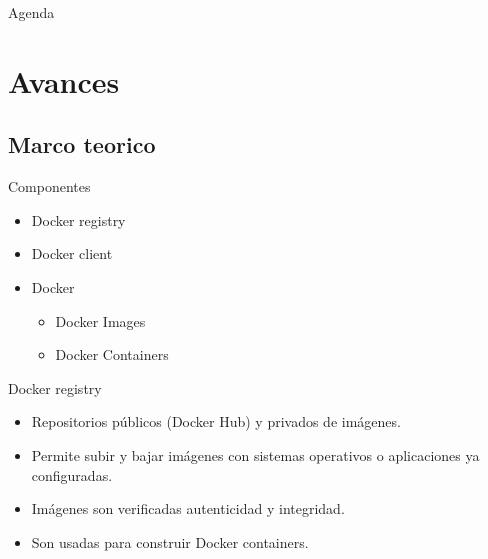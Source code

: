 \documentclass{bredelebeamer}
\begin{document}
\begin{frame}{Agenda}
  \tableofcontents
\end{frame}

\section{Avances}
\subsection{Marco teorico}

\begin{frame}{Componentes}
	
	\begin{itemize}
		\item Docker registry
		\item Docker client
		\item Docker
		\begin{itemize}
			\item Docker Images
			\item Docker Containers
		\end{itemize}

	\end{itemize}
\end{frame}


\begin{frame}{Docker registry}
\begin{itemize}
	\item Repositorios públicos (Docker Hub) y privados de imágenes.
	\item Permite subir y bajar imágenes con sistemas operativos o aplicaciones ya configuradas.
	\item Imágenes son verificadas autenticidad y integridad.	
	\item Son usadas para construir Docker containers.
\end{itemize}

\end{frame}
\end{document}
